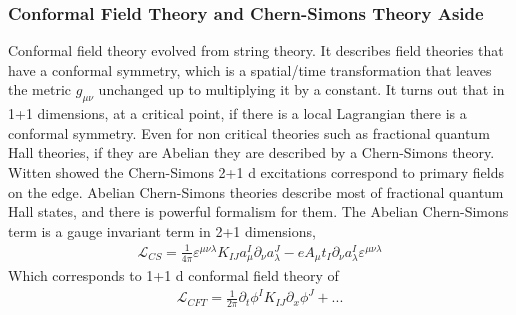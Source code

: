 \subsubsection{Conformal Field Theory and Chern-Simons Theory Aside}
Conformal field theory evolved from string theory. It describes field theories that have a conformal symmetry, which is a spatial/time transformation that leaves the metric $g_{\mu \nu}$ unchanged up to multiplying it by a constant. It turns out that in 1+1 dimensions, at a critical point, if there is a local Lagrangian there is a conformal symmetry. Even for non critical theories such as fractional quantum Hall theories, if they are Abelian they are described by a Chern-Simons theory. Witten showed the Chern-Simons 2+1 d excitations correspond to primary fields on the edge. Abelian Chern-Simons theories describe most of fractional quantum Hall states, and there is powerful formalism for them. The Abelian Chern-Simons term is a gauge invariant term in 2+1 dimensions, 
\begin{align}
\mathcal{L}_{CS} = \frac{1}{4\pi}\varepsilon^{\mu \nu \lambda }K_{IJ}a_\mu^I\partial_\nu a^J_\lambda -e A_\mu t_I \partial_\nu a^I_\lambda \varepsilon^{\mu \nu \lambda }
\end{align}
Which corresponds to 1+1 d conformal field theory of 
\begin{align}
\mathcal{L}_{CFT} = \frac{1}{2\pi}\partial_t\phi^I K_{IJ} \partial_x\phi^J + ...
\end{align}

